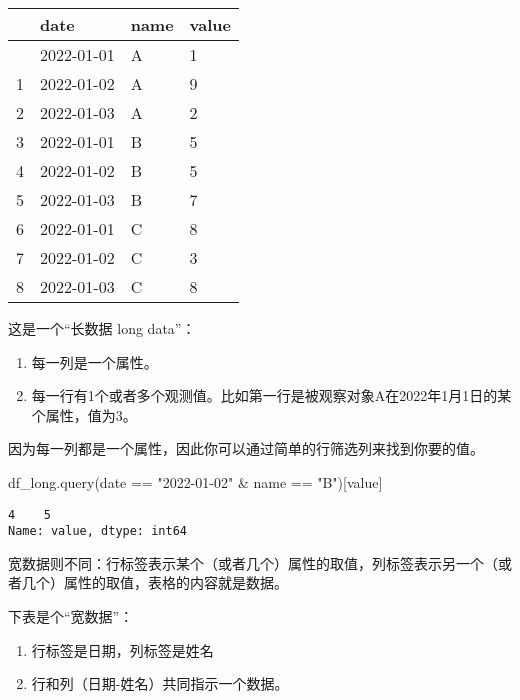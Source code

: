 \documentclass[
  letterpaper,
  DIV=11,
  numbers=noendperiod]{scrreprt}
\newenvironment{Shaded}{\begin{snugshade}}{\end{snugshade}}
\newcommand{\NormalTok}[1]{\textcolor[rgb]{0.00,0.23,0.31}{#1}}
\newcommand{\StringTok}[1]{\textcolor[rgb]{0.13,0.47,0.30}{#1}}
\providecommand{\tightlist}{%
  \setlength{\itemsep}{0pt}\setlength{\parskip}{0pt}}\usepackage{longtable,booktabs,array}
\begin{document}
\begin{longtable}[]{@{}llll@{}}
\toprule\noalign{}
& date & name & value \\
\midrule\noalign{}
\endhead
\bottomrule\noalign{}
\endlastfoot
0 & 2022-01-01 & A & 1 \\
1 & 2022-01-02 & A & 9 \\
2 & 2022-01-03 & A & 2 \\
3 & 2022-01-01 & B & 5 \\
4 & 2022-01-02 & B & 5 \\
5 & 2022-01-03 & B & 7 \\
6 & 2022-01-01 & C & 8 \\
7 & 2022-01-02 & C & 3 \\
8 & 2022-01-03 & C & 8 \\
\end{longtable}

这是一个``长数据 long data''：

\begin{enumerate}
\def\labelenumi{\arabic{enumi}.}
\tightlist
\item
  每一列是一个属性。
\item
  每一行有1个或者多个观测值。比如第一行是被观察对象A在2022年1月1日的某个属性，值为3。
\end{enumerate}

因为每一列都是一个属性，因此你可以通过简单的行筛选列来找到你要的值。

\begin{Shaded}
\begin{Highlighting}[]
\NormalTok{df\_long.query(}\StringTok{\textquotesingle{}date == "2022{-}01{-}02" \& name == "B"\textquotesingle{}}\NormalTok{)[}\StringTok{\textquotesingle{}value\textquotesingle{}}\NormalTok{]}
\end{Highlighting}
\end{Shaded}

\begin{verbatim}
4    5
Name: value, dtype: int64
\end{verbatim}

宽数据则不同：行标签表示某个（或者几个）属性的取值，列标签表示另一个（或者几个）属性的取值，表格的内容就是数据。

下表是个``宽数据''：

\begin{enumerate}
\def\labelenumi{\arabic{enumi}.}
\tightlist
\item
  行标签是日期，列标签是姓名
\item
  行和列（日期-姓名）共同指示一个数据。
\end{enumerate}
\end{document}
